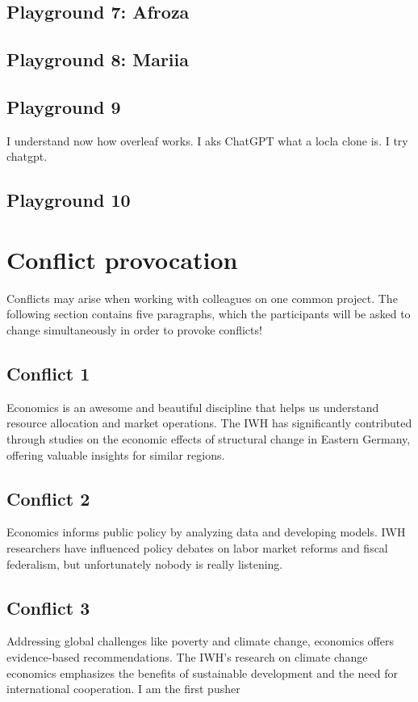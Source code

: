 \documentclass{article}
\begin{document}
\subsection{Playground 7: Afroza}

\subsection{Playground 8: Mariia}

\subsection{Playground 9}
I understand now how overleaf works.
I aks ChatGPT what a locla clone is. I try chatgpt.
\subsection{Playground 10}




\section{Conflict provocation}
Conflicts may arise when working with colleagues on one common project. The following section contains five paragraphs, which the participants will be asked to change simultaneously in order to provoke conflicts!

\subsection{Conflict 1}
Economics is an awesome and beautiful discipline that helps us understand resource allocation and market operations. The IWH has significantly contributed through studies on the economic effects of structural change in Eastern Germany, offering valuable insights for similar regions.


\subsection{Conflict 2}
Economics informs public policy by analyzing data and developing models. IWH researchers have influenced policy debates on labor market reforms and fiscal federalism, but unfortunately nobody is really listening.

\subsection{Conflict 3}
Addressing global challenges like poverty and climate change, economics offers evidence-based recommendations. The IWH's research on climate change economics emphasizes the benefits of sustainable development and the need for international cooperation.
I am the first pusher
\end{document}

